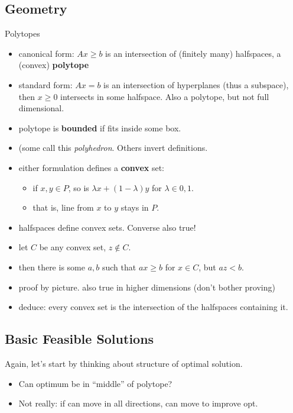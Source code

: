 \documentclass{article}
\begin{document}
\subsection{Geometry}

Polytopes
\begin{itemize}
\item canonical form: $Ax \ge b$ is an intersection of (finitely many)
  halfspaces, a (convex) {\bf polytope}
\item standard form: $Ax=b$ is an intersection of hyperplanes (thus a
  subspace), then $x \ge 0$ intersects in some halfspace.  Also a
  polytope, but not full dimensional.
\item polytope is {\bf bounded} if fits inside some box.
\item (some call this \emph{polyhedron}.  Others invert definitions.
\item either formulation defines a {\bf convex} set:
  \begin{itemize}
  \item if $x, y \in P$, so is $\lambda x+(1-\lambda)y$ for $\lambda \in
    0,1$.
  \item that is, line from $x$ to $y$ stays in $P$.
  \end{itemize}
\item halfspaces define convex sets.  Converse also true!
  \item let $C$ be any convex set, $z \notin C$.  
  \item then there is some $a,b$ such that $ax \ge b$ for $x \in C$, but
    $az < b$.
\item proof by picture.  also true in higher dimensions (don't bother proving)
\item deduce: every convex set is the intersection of the halfspaces
  containing it.
\end{itemize}

\subsection{Basic Feasible Solutions}

Again, let's start by thinking about structure of optimal solution.
\begin{itemize}
\item Can optimum be in ``middle'' of polytope?
\item Not really: if can move in all directions, can move to improve
  opt.
\end{itemize}
\end{document}
